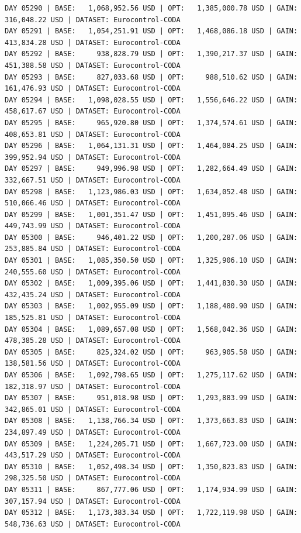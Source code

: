 \documentclass[11pt,a4paper]{article}
\begin{document}
\begin{verbatim}
DAY 05290 | BASE:   1,068,952.56 USD | OPT:   1,385,000.78 USD | GAIN: 316,048.22 USD | DATASET: Eurocontrol-CODA
DAY 05291 | BASE:   1,054,251.91 USD | OPT:   1,468,086.18 USD | GAIN: 413,834.28 USD | DATASET: Eurocontrol-CODA
DAY 05292 | BASE:     938,828.79 USD | OPT:   1,390,217.37 USD | GAIN: 451,388.58 USD | DATASET: Eurocontrol-CODA
DAY 05293 | BASE:     827,033.68 USD | OPT:     988,510.62 USD | GAIN: 161,476.93 USD | DATASET: Eurocontrol-CODA
DAY 05294 | BASE:   1,098,028.55 USD | OPT:   1,556,646.22 USD | GAIN: 458,617.67 USD | DATASET: Eurocontrol-CODA
DAY 05295 | BASE:     965,920.80 USD | OPT:   1,374,574.61 USD | GAIN: 408,653.81 USD | DATASET: Eurocontrol-CODA
DAY 05296 | BASE:   1,064,131.31 USD | OPT:   1,464,084.25 USD | GAIN: 399,952.94 USD | DATASET: Eurocontrol-CODA
DAY 05297 | BASE:     949,996.98 USD | OPT:   1,282,664.49 USD | GAIN: 332,667.51 USD | DATASET: Eurocontrol-CODA
DAY 05298 | BASE:   1,123,986.03 USD | OPT:   1,634,052.48 USD | GAIN: 510,066.46 USD | DATASET: Eurocontrol-CODA
DAY 05299 | BASE:   1,001,351.47 USD | OPT:   1,451,095.46 USD | GAIN: 449,743.99 USD | DATASET: Eurocontrol-CODA
DAY 05300 | BASE:     946,401.22 USD | OPT:   1,200,287.06 USD | GAIN: 253,885.84 USD | DATASET: Eurocontrol-CODA
DAY 05301 | BASE:   1,085,350.50 USD | OPT:   1,325,906.10 USD | GAIN: 240,555.60 USD | DATASET: Eurocontrol-CODA
DAY 05302 | BASE:   1,009,395.06 USD | OPT:   1,441,830.30 USD | GAIN: 432,435.24 USD | DATASET: Eurocontrol-CODA
DAY 05303 | BASE:   1,002,955.09 USD | OPT:   1,188,480.90 USD | GAIN: 185,525.81 USD | DATASET: Eurocontrol-CODA
DAY 05304 | BASE:   1,089,657.08 USD | OPT:   1,568,042.36 USD | GAIN: 478,385.28 USD | DATASET: Eurocontrol-CODA
DAY 05305 | BASE:     825,324.02 USD | OPT:     963,905.58 USD | GAIN: 138,581.56 USD | DATASET: Eurocontrol-CODA
DAY 05306 | BASE:   1,092,798.65 USD | OPT:   1,275,117.62 USD | GAIN: 182,318.97 USD | DATASET: Eurocontrol-CODA
DAY 05307 | BASE:     951,018.98 USD | OPT:   1,293,883.99 USD | GAIN: 342,865.01 USD | DATASET: Eurocontrol-CODA
DAY 05308 | BASE:   1,138,766.34 USD | OPT:   1,373,663.83 USD | GAIN: 234,897.49 USD | DATASET: Eurocontrol-CODA
DAY 05309 | BASE:   1,224,205.71 USD | OPT:   1,667,723.00 USD | GAIN: 443,517.29 USD | DATASET: Eurocontrol-CODA
DAY 05310 | BASE:   1,052,498.34 USD | OPT:   1,350,823.83 USD | GAIN: 298,325.50 USD | DATASET: Eurocontrol-CODA
DAY 05311 | BASE:     867,777.06 USD | OPT:   1,174,934.99 USD | GAIN: 307,157.94 USD | DATASET: Eurocontrol-CODA
DAY 05312 | BASE:   1,173,383.34 USD | OPT:   1,722,119.98 USD | GAIN: 548,736.63 USD | DATASET: Eurocontrol-CODA

\end{verbatim}
\end{document}
